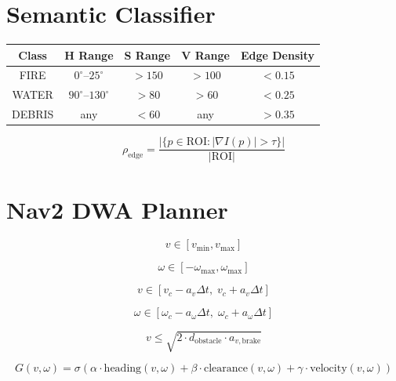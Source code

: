 \documentclass[11pt]{article}
\begin{document}
\section{Semantic Classifier}

\begin{center}
\begin{tabular}{ccccc}
\toprule
Class & H Range & S Range & V Range & Edge Density \\
\midrule
FIRE   & $0^\circ$--$25^\circ$   & $>150$ & $>100$ & $<0.15$ \\
WATER  & $90^\circ$--$130^\circ$ & $>80$  & $>60$  & $<0.25$ \\
DEBRIS & any & $<60$ & any & $>0.35$ \\
\bottomrule
\end{tabular}
\end{center}

\begin{equation}
\rho_{\text{edge}} =
\frac{\left|\{p \in \text{ROI} : |\nabla I(p)| > \tau\}\right|}{|\text{ROI}|}
\end{equation}

\section{Nav2 DWA Planner}

\begin{equation}
v \in [v_{\min}, v_{\max}]
\end{equation}

\begin{equation}
\omega \in [-\omega_{\max}, \omega_{\max}]
\end{equation}

\begin{equation}
v \in [v_c - a_v \Delta t,\; v_c + a_v \Delta t]
\end{equation}

\begin{equation}
\omega \in [\omega_c - a_\omega \Delta t,\; \omega_c + a_\omega \Delta t]
\end{equation}

\begin{equation}
v \leq \sqrt{2 \cdot d_{\text{obstacle}} \cdot a_{v,\text{brake}}}
\end{equation}

\begin{equation}
G(v,\omega) =
\sigma\left(
\alpha \cdot \text{heading}(v,\omega)
+ \beta \cdot \text{clearance}(v,\omega)
+ \gamma \cdot \text{velocity}(v,\omega)
\right)
\end{equation}
\end{document}
